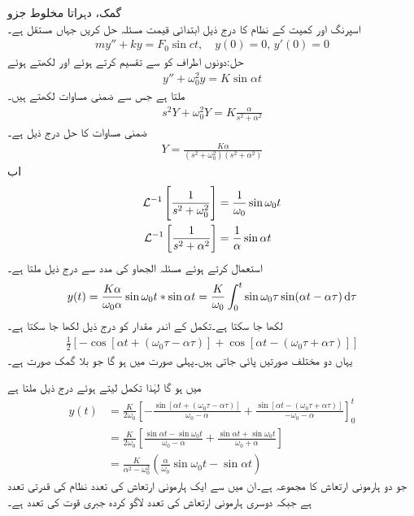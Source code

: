 \quad گمک، دہراتا مخلوط جزو\\
اسپرنگ اور کمیت کے نظام کا درج ذیل ابتدائی قیمت مسئلہ حل کریں جہاں  مستقل ہے۔
\begin{align*}
my''+ky=F_0\sin ct,\quad y(0)=0,\, y'(0)=0
\end{align*}
حل:دونوں اطراف کو  سے تقسیم کرتے ہوئے  اور  لکھتے ہوئے
\begin{align*}
y''+\omega_0^2y=K\sin \alpha t
\end{align*}
ملتا ہے جس سے ضمنی مساوات لکھتے ہیں۔
\begin{align*}
s^2Y+\omega_0^2Y=K\frac{\alpha }{s^2+\alpha^2}
\end{align*} 
ضمنی مساوات کا حل درج ذیل ہے۔
\begin{align*}
Y=\frac{K\alpha}{(s^2+\omega_0^2)(s^2+\alpha^2)}
\end{align*}
اب 
\begin{align*}
\mathcal{L}^{-1}\left[\frac{1}{s^2+\omega_0^2}\right]&=\frac{1}{\omega_0} \sin \omega_0 t\\
\mathcal{L}^{-1}\left[\frac{1}{s^2+\alpha^2}\right]&=\frac{1}{\alpha} \sin \alpha t
\end{align*}
استعمال کرتے ہوئے مسئلہ الجھاو کی مدد سے درج ذیل ملتا ہے۔
\begin{align*}
y(t)=\frac{K \alpha}{\omega_0 \alpha} \sin \omega_0 t * \sin \alpha t=\frac{K}{\omega_0}\int_{0}^{t}\sin \omega_0 \tau \sin (\alpha t-\alpha \tau)\dif \tau
\end{align*}
لکھا جا سکتا ہے۔تکمل کے اندر مقدار کو درج ذیل لکھا جا سکتا ہے۔
\begin{align}\label{مساوات_لاپلاس_گمک_الف}
\frac{1}{2}[-\cos[\alpha t+(\omega_0 \tau-\alpha \tau)]+\cos[\alpha t-(\omega_0 \tau+\alpha \tau)]]
\end{align}
یہاں دو مختلف صورتیں پائی جاتی ہیں۔پہلی صورت میں  ہو گا جو بلا گمک صورت ہے۔

 میں  ہو گا لہٰذا تکمل لیتے ہوئے درج ذیل ملتا ہے
\begin{align*}
y(t)&=\frac{K}{2\omega_0}\left[-\frac{\sin[\alpha t+(\omega_0 \tau-\alpha \tau)]}{\omega_0-\alpha}+\frac{\sin[\alpha t-(\omega_0 \tau+\alpha \tau)]}{-\omega_0-\alpha}\right]_{0}^{t}\\
&=\frac{K}{2\omega_0}\left[\frac{\sin \alpha t-\sin \omega_0 t}{\omega_0-\alpha}+\frac{\sin \alpha t+\sin \omega_0 t}{\omega_0+\alpha}\right]\\
&=\frac{K}{\alpha^2-\omega_0^2}(\frac{\alpha}{\omega_0}\sin \omega_0 t-\sin \alpha t)
\end{align*}
جو دو ہارمونی ارتعاش کا مجموعہ ہے۔ان میں سے ایک ہارمونی ارتعاش کی تعدد نظام کی قدرتی تعدد  ہے جبکہ دوسری ہارمونی ارتعاش کی تعدد لاگو کردہ جبری قوت کی تعدد  ہے۔

